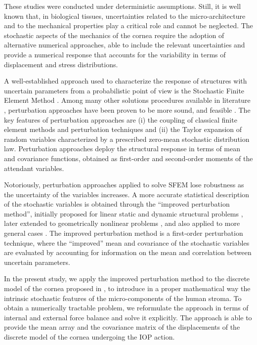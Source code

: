 \documentclass[preprint,12pt]{elsarticle}
\begin{document}
These studies were conducted under deterministic assumptions. Still, it is well known that, in biological tissues, uncertainties related to the micro-architecture and to the mechanical properties play a critical role and cannot be neglected. The stochastic aspects of the mechanics of the cornea require the adoption of alternative numerical approaches, able to include the relevant uncertainties and provide a numerical response that accounts for the variability in terms of displacement and stress distributions.

A well-established approach used to characterize the response of structures with uncertain parameters from a probabilistic point of view is the Stochastic Finite Element Method \cite{stefanou2009stochastic, pryse2018projection,falsone2013explicit, navarro2022new}. Among many other solutions procedures available in literature \cite{ghanem2003stochastic}, perturbation approaches have been proven to be more sound, and feasible \cite{liu1986probabilistic, kleiber1992stochastic}. The key features of perturbation approaches are (i) the coupling of classical finite element methods and perturbation techniques and (ii) the Taylor expansion of random variables characterized by a prescribed zero-mean stochastic distribution law. Perturbation approaches deploy the structural response in terms of mean and covariance functions, obtained as first-order and second-order moments of the attendant variables.

Notoriously, perturbation approaches applied to solve SFEM lose robustness as the uncertainty of the variables increases. A more accurate statistical description of the stochastic variables is obtained through the ``improved perturbation method'', initially proposed for linear static and dynamic structural problems \cite{elishakoff1995improved, muscolino2000improved}, later extended to geometrically nonlinear problems \cite{impollonia2002static}, and also applied to more general cases \cite{van2003modal, kaminski2013stochastic, kasinos2021reduced}. The improved perturbation method is a first-order perturbation technique, where the ``improved'' mean and covariance of the stochastic variables are evaluated by accounting for information on the mean and correlation between uncertain parameters. 

In the present study, we apply the improved perturbation method to the discrete model of the cornea proposed in \cite{pandolfi:2019}, to introduce in a proper mathematical way the intrinsic stochastic features of the micro-components of the human stroma. To obtain a numerically tractable problem, we reformulate the approach in terms of internal and external force balance and solve it explicitly. The approach is able to provide the mean array and the covariance matrix of the displacements of the discrete model of the cornea undergoing the IOP action.
\end{document}
